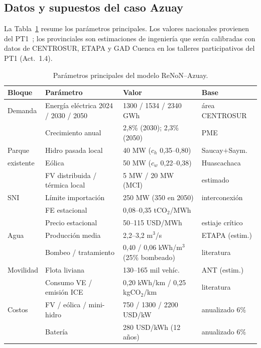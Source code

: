 \documentclass[11pt,a4paper]{article}
\begin{document}
\subsection{Datos y supuestos del caso Azuay}
La Tabla~\ref{tab:parametros} resume los par\'ametros principales. Los valores nacionales
provienen del PT1~\cite{reporte2025}; los provinciales son estimaciones de ingenier\'ia
que ser\'an calibradas con datos de CENTROSUR, ETAPA y GAD Cuenca en los talleres
participativos del PT1 (Act.~1.4).

\begin{table}[htbp]
\centering\small
\caption{Par\'ametros principales del modelo ReNoN--Azuay.}
\label{tab:parametros}
\begin{tabular}{llll}
\toprule
\textbf{Bloque} & \textbf{Par\'ametro} & \textbf{Valor} & \textbf{Base} \\
\midrule
Demanda   & Energ\'ia el\'ectrica 2024 / 2030 / 2050 & 1300 / 1534 / 2340 GWh & \'area CENTROSUR \\
          & Crecimiento anual & 2,8\% (2030); 2,3\% (2050) & PME \\
Parque    & Hidro pasada local & 40 MW ($c_h$ 0,35--0,80) & Saucay$+$Saym.\ \\
existente & E\'olica & 50 MW ($c_w$ 0,22--0,38) & Huascachaca \\
          & FV distribuida / t\'ermica local & 5 MW / 20 MW (MCI) & estimado \\
SNI       & L\'imite importaci\'on & 250 MW (350 en 2050) & interconexi\'on \\
          & FE estacional & 0,08--0,35 tCO$_2$/MWh & \cite{reporte2025} \\
          & Precio estacional & 50--115 USD/MWh & estiaje cr\'itico \\
Agua      & Producci\'on media & 2,2--3,2 m$^3$/s & ETAPA (estim.) \\
          & Bombeo / tratamiento & 0,40 / 0,06 kWh/m$^3$ (25\% bombeado) & literatura \\
Movilidad & Flota liviana & 130--165 mil veh\'ic. & ANT (estim.) \\
          & Consumo VE / emisi\'on ICE & 0,20 kWh/km / 0,25 kgCO$_2$/km & literatura \\
Costos    & FV / e\'olica / mini-hidro & 750 / 1300 / 2200 USD/kW & anualizado 6\% \\
          & Bater\'ia & 280 USD/kWh (12 a\~nos) & anualizado 6\% \\
\bottomrule
\end{tabular}
\end{table}
\end{document}

